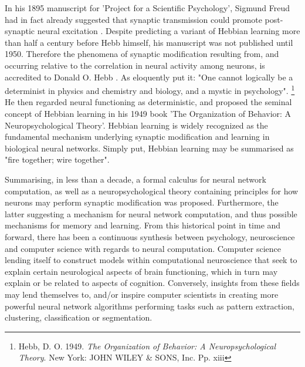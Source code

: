 In his 1895 manuscript for 'Project for a Scientific Psychology', Sigmund Freud had in fact already suggested that synaptic transmission could promote post-synaptic neural excitation \citep{Kiernan2011}. Despite predicting a variant of Hebbian learning more than half a century before Hebb himself, his manuscript was not published until 1950. Therefore the phenomena of synaptic modification resulting from, and occurring relative to the correlation in neural activity among neurons, is accredited to Donald O. Hebb \citep{Kiernan2011}.
As \cite{Hebb1949} eloquently put it: "One cannot logically be a determinist in physics and chemistry and biology, and a mystic in psychology".
\footnote{Hebb, D. O. 1949. \textit{The Organization of Behavior: A Neuropsychological Theory}. New York: JOHN WILEY \& SONS, Inc. Pp. xiii}
He then regarded neural functioning as deterministic, and proposed the seminal concept of Hebbian learning in his 1949 book 'The Organization of Behavior: A Neuropsychological Theory'. Hebbian learning is widely recognized as the fundamental mechanism underlying synaptic modification and learning in biological neural networks. Simply put, Hebbian learning may be summarised as "fire together; wire together".

Summarising, in less than a decade, a formal calculus for neural network computation, as well as a neuropsychological theory containing principles for how neurons may perform synaptic modification was proposed. Furthermore, the latter suggesting a mechanism for neural network computation, and thus possible mechanisms for memory and learning. From this historical point in time and forward, there has been a continuous synthesis between psychology, neuroscience and computer science with regards to neural computation. Computer science lending itself to construct models within computational neuroscience that seek to explain certain neurological aspects of brain functioning, which in turn may explain or be related to aspects of cognition. Conversely, insights from these fields may lend themselves to, and/or inspire computer scientists in creating more powerful neural network algorithms performing tasks such as pattern extraction, clustering, classification or segmentation. 

